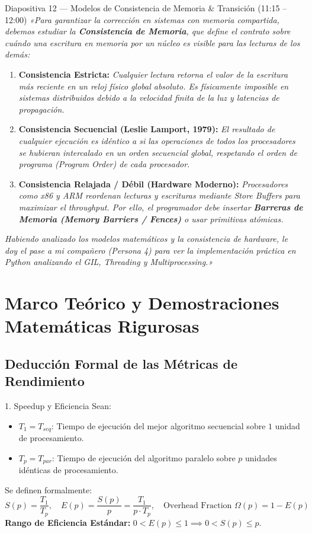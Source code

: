 \documentclass[11pt,a4paper]{article}
\begin{document}
\begin{guionbox}{Diapositiva 12 --- Modelos de Consistencia de Memoria \& Transición (11:15 -- 12:00)}
\textit{«Para garantizar la corrección en sistemas con memoria compartida, debemos estudiar la \textbf{Consistencia de Memoria}, que define el contrato sobre cuándo una escritura en memoria por un núcleo es visible para las lecturas de los demás:}

\begin{enumerate}[leftmargin=5mm]
    \item \textbf{Consistencia Estricta:} \textit{Cualquier lectura retorna el valor de la escritura más reciente en un reloj físico global absoluto. Es físicamente imposible en sistemas distribuidos debido a la velocidad finita de la luz y latencias de propagación.}
    \item \textbf{Consistencia Secuencial (Leslie Lamport, 1979):} \textit{El resultado de cualquier ejecución es idéntico a si las operaciones de todos los procesadores se hubieran intercalado en un orden secuencial global, respetando el orden de programa (Program Order) de cada procesador.}
    \item \textbf{Consistencia Relajada / Débil (Hardware Moderno):} \textit{Procesadores como x86 y ARM reordenan lecturas y escrituras mediante Store Buffers para maximizar el throughput. Por ello, el programador debe insertar \textbf{Barreras de Memoria (Memory Barriers / Fences)} o usar primitivas atómicas.}
\end{enumerate}

\textit{Habiendo analizado los modelos matemáticos y la consistencia de hardware, le doy el pase a mi compañero (Persona 4) para ver la implementación práctica en Python analizando el GIL, Threading y Multiprocessing.»}
\end{guionbox}

\section{Marco Teórico y Demostraciones Matemáticas Rigurosas}

\subsection{Deducción Formal de las Métricas de Rendimiento}

\begin{formulabox}{1. Speedup y Eficiencia}
Sean:
\begin{itemize}[leftmargin=5mm]
    \item $T_1 = T_{seq}$: Tiempo de ejecución del mejor algoritmo secuencial sobre $1$ unidad de procesamiento.
    \item $T_p = T_{par}$: Tiempo de ejecución del algoritmo paralelo sobre $p$ unidades idénticas de procesamiento.
\end{itemize}
Se definen formalmente:
\[
S(p) = \frac{T_1}{T_p}, \quad E(p) = \frac{S(p)}{p} = \frac{T_1}{p \cdot T_p}, \quad \text{Overhead Fraction } \Omega(p) = 1 - E(p)
\]
\textbf{Rango de Eficiencia Estándar:} $0 < E(p) \le 1 \implies 0 < S(p) \le p$.
\end{formulabox}
\end{document}
